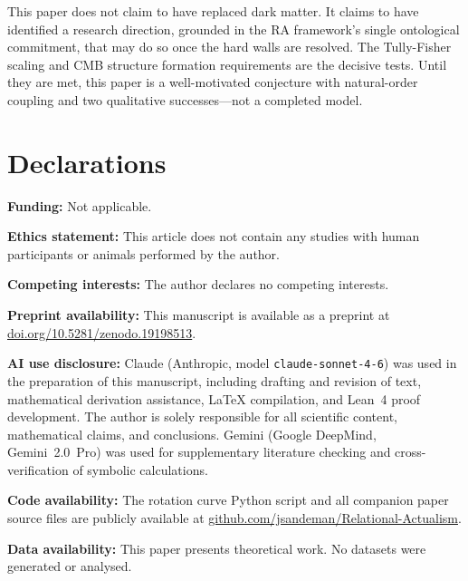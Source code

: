\documentclass[11pt,a4paper]{article}
\theoremstyle{plain}
\theoremstyle{definition}
\theoremstyle{remark}
\begin{document}
This paper does not claim to have replaced dark matter. It claims to have
identified a research direction, grounded in the RA framework's single ontological
commitment, that may do so once the hard walls are resolved. The Tully-Fisher
scaling and CMB structure formation requirements are the decisive tests. Until
they are met, this paper is a well-motivated conjecture with natural-order coupling
and two qualitative successes---not a completed model.


\section*{Declarations}
\textbf{Funding:} Not applicable.

\textbf{Ethics statement:} This article does not contain any studies with human participants or animals performed by the author.

\quad
\textbf{Competing interests:} The author declares no competing interests.

\textbf{Preprint availability:} This manuscript is available as a preprint at
\href{https://doi.org/10.5281/zenodo.19198513}{doi.org/10.5281/zenodo.19198513}.

\textbf{AI use disclosure:} Claude (Anthropic, model \texttt{claude-sonnet-4-6}) was used in the preparation of this manuscript, including drafting and revision of text, mathematical derivation assistance, \LaTeX{} compilation, and Lean~4 proof development. The author is solely responsible for all scientific content, mathematical claims, and conclusions. Gemini (Google DeepMind, Gemini~2.0~Pro) was used for supplementary literature checking and cross-verification of symbolic calculations.


\textbf{Code availability:} The rotation curve Python script and all companion paper source files are publicly available at \href{https://github.com/jsandeman/Relational-Actualism}{github.com/jsandeman/Relational-Actualism}.

\textbf{Data availability:} This paper presents theoretical work. No datasets
were generated or analysed.
\end{document}
